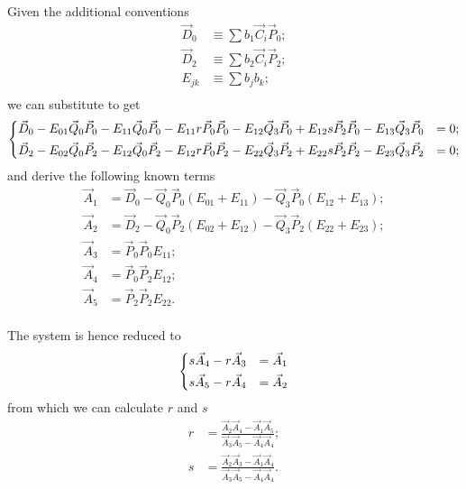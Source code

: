 \documentclass{scrartcl}
\newcommand\V[1]{\vec{#1}}
\begin{document}
Given the additional conventions
\begin{equation}\label{eq:DE}
\begin{split}
    \V{D}_0 &\equiv \sum b_1 \V{C}_i \V{P}_0; \\
    \V{D}_2 &\equiv \sum b_2 \V{C}_i \V{P}_2; \\
    E_{jk} &\equiv \sum b_j b_k; \\
\end{split}
\end{equation}
we can substitute to get
\begin{equation*}
\begin{dcases}
\V{D}_0 -
    E_{01} \V{Q}_0 \V{P}_0 -
    E_{11} \V{Q}_0 \V{P}_0 -
    E_{11} r \V{P}_0 \V{P}_0 -
    E_{12} \V{Q}_3 \V{P}_0 +
    E_{12} s \V{P}_2 \V{P}_0 -
    E_{13} \V{Q}_3 \V{P}_0 &= 0; \\
\V{D}_2 -
    E_{02} \V{Q}_0 \V{P}_2 -
    E_{12} \V{Q}_0 \V{P}_2 -
    E_{12} r \V{P}_0 \V{P}_2 -
    E_{22} \V{Q}_3 \V{P}_2 +
    E_{22} s \V{P}_2 \V{P}_2 -
    E_{23} \V{Q}_3 \V{P}_2 &= 0; \\
\end{dcases}
\end{equation*}
and derive the following known terms
\begin{equation}\label{eq:ACD}
\begin{split}
\V{A}_1 &= \V{D}_0 -
    \V{Q}_0 \V{P}_0 (E_{01} + E_{11}) -
    \V{Q}_3 \V{P}_0 (E_{12} + E_{13}); \\
\V{A}_2 &= \V{D}_2 -
    \V{Q}_0 \V{P}_2 (E_{02} + E_{12}) -
    \V{Q}_3 \V{P}_2 (E_{22} + E_{23}); \\
\V{A}_3 &= \V{P}_0 \V{P}_0 E_{11}; \\
\V{A}_4 &= \V{P}_0 \V{P}_2 E_{12}; \\
\V{A}_5 &= \V{P}_2 \V{P}_2 E_{22}. \\
\end{split}
\end{equation}

The system is hence reduced to
\begin{equation*}
\begin{dcases}
    s \V{A}_4 - r \V{A}_3 &= \V{A}_1\\
    s \V{A}_5 - r \V{A}_4 &= \V{A}_2\\
\end{dcases}
\end{equation*}
from which we can calculate $r$ and $s$
\begin{equation}\label{eq:rs}
\begin{split}
    r &= \frac{\V{A}_2 \V{A}_4 - \V{A}_1 \V{A}_5}{\V{A}_3 \V{A}_5 - \V{A}_4 \V{A}_4}; \\
    s &= \frac{\V{A}_2 \V{A}_3 - \V{A}_1 \V{A}_4}{\V{A}_3 \V{A}_5 - \V{A}_4 \V{A}_4}. \\
\end{split}
\end{equation}
\end{document}
